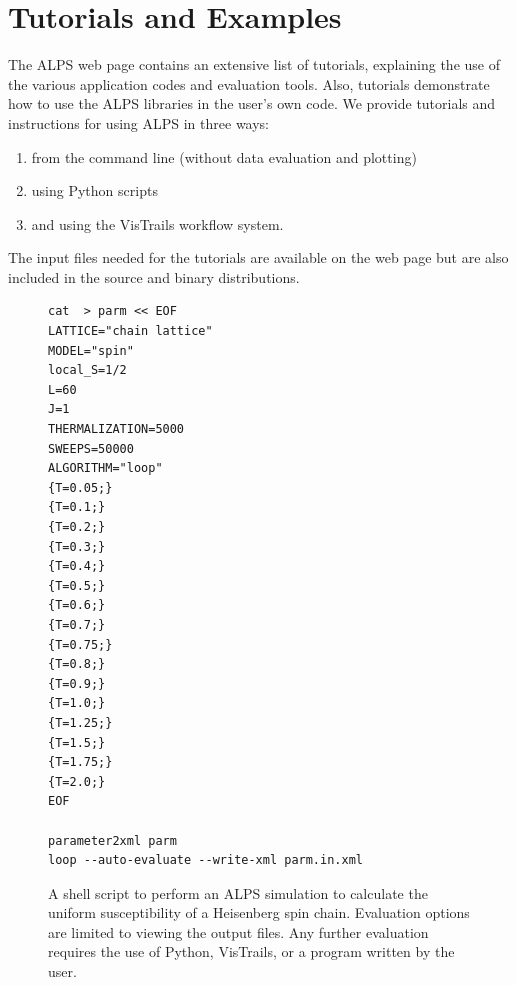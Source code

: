 \documentclass[12pt]{iopart}
\begin{document}
\section{Tutorials and Examples}

The ALPS web page \cite{alps} contains an extensive list of tutorials, explaining the use of the various application codes and evaluation tools.  Also, tutorials demonstrate how to use the ALPS libraries in the user's own code. We provide tutorials and instructions for using ALPS in three ways: 
\begin{enumerate}
\item from the command line (without data evaluation and plotting)
\item using Python scripts
\item and using the VisTrails workflow system. 
\end{enumerate}

The input files needed for the tutorials are available on the web page but are also included in the source and binary distributions.

\begin{figure}
\begin{tiny}
\begin{center}
\begin{verbatim}
cat  > parm << EOF
LATTICE="chain lattice"
MODEL="spin"
local_S=1/2
L=60
J=1
THERMALIZATION=5000
SWEEPS=50000
ALGORITHM="loop"
{T=0.05;}
{T=0.1;}
{T=0.2;}
{T=0.3;}
{T=0.4;}
{T=0.5;}
{T=0.6;}
{T=0.7;}
{T=0.75;}
{T=0.8;}
{T=0.9;}
{T=1.0;}
{T=1.25;}
{T=1.5;}
{T=1.75;}
{T=2.0;}
EOF

parameter2xml parm
loop --auto-evaluate --write-xml parm.in.xml
\end{verbatim}
\end{center}
\end{tiny}
\caption{A shell script to perform an ALPS simulation to calculate the uniform susceptibility of a Heisenberg spin chain. Evaluation options are limited to viewing the output files. Any further evaluation requires the use of Python, VisTrails, or a program written by the user.}
\label{fig:commandline}
\end{figure}
\end{document}
